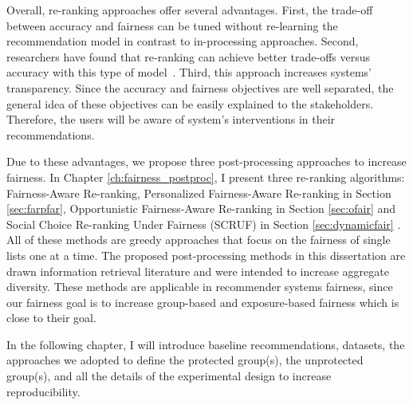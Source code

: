         Overall, re-ranking approaches offer several advantages. First, the trade-off between accuracy and fairness can be tuned without re-learning the recommendation model in contrast to in-processing approaches. Second, researchers have found that re-ranking can achieve better trade-offs versus accuracy with this type of model~\cite{abdollahpouri2019managing,liu2019personalized}. Third, this approach increases systems' transparency. Since the accuracy and fairness objectives are well separated, the general idea of these objectives can be easily explained to the stakeholders. Therefore, the users will be aware of system's interventions in their recommendations.
        
        Due to these advantages, we propose three post-processing approaches to increase fairness. In Chapter \ref{ch:fairness_postproc}, I present three re-ranking algorithms: Fairness-Aware Re-ranking, Personalized Fairness-Aware Re-ranking in Section \ref{sec:farpfar}, Opportunistic Fairness-Aware Re-ranking in Section \ref{sec:ofair} and Social Choice Re-ranking Under Fairness (SCRUF) in Section \ref{sec:dynamicfair} . All of these methods are greedy approaches that focus on the fairness of single lists one at a time. The proposed post-processing methods in this dissertation are drawn information retrieval literature and were intended to increase aggregate diversity. These methods are applicable in recommender systems fairness, since our fairness goal is to increase group-based and exposure-based fairness which is close to their goal.
        
        
In the following chapter, I will introduce baseline recommendations, datasets, the approaches we adopted to define the protected group(s), the unprotected group(s), and all the details of the experimental design to increase reproducibility.